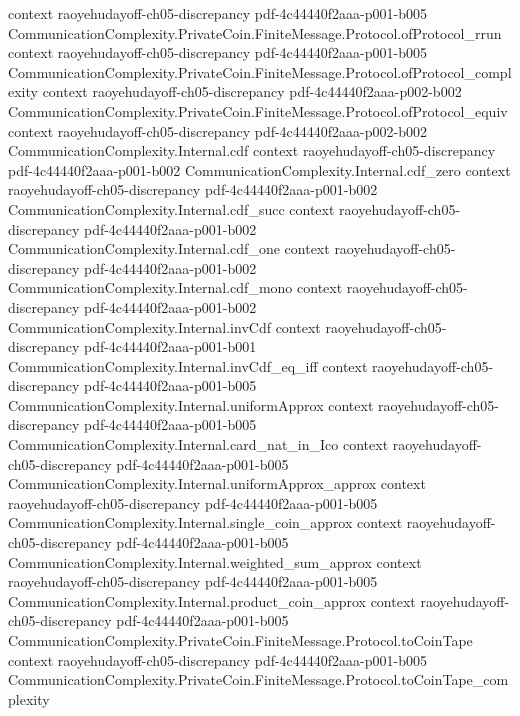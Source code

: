 \begin{lemma}
  {context}
  {raoyehudayoff-ch05-discrepancy}
  {pdf-4c44440f2aaa-p001-b005}
\proofstep
  {CommunicationComplexity.PrivateCoin.FiniteMessage.Protocol.ofProtocol_rrun}
  {context}
  {raoyehudayoff-ch05-discrepancy}
  {pdf-4c44440f2aaa-p001-b005}
\proofstep
  {CommunicationComplexity.PrivateCoin.FiniteMessage.Protocol.ofProtocol_complexity}
  {context}
  {raoyehudayoff-ch05-discrepancy}
  {pdf-4c44440f2aaa-p002-b002}
\proofstep
  {CommunicationComplexity.PrivateCoin.FiniteMessage.Protocol.ofProtocol_equiv}
  {context}
  {raoyehudayoff-ch05-discrepancy}
  {pdf-4c44440f2aaa-p002-b002}
\proofstep
  {CommunicationComplexity.Internal.cdf}
  {context}
  {raoyehudayoff-ch05-discrepancy}
  {pdf-4c44440f2aaa-p001-b002}
\proofstep
  {CommunicationComplexity.Internal.cdf_zero}
  {context}
  {raoyehudayoff-ch05-discrepancy}
  {pdf-4c44440f2aaa-p001-b002}
\proofstep
  {CommunicationComplexity.Internal.cdf_succ}
  {context}
  {raoyehudayoff-ch05-discrepancy}
  {pdf-4c44440f2aaa-p001-b002}
\proofstep
  {CommunicationComplexity.Internal.cdf_one}
  {context}
  {raoyehudayoff-ch05-discrepancy}
  {pdf-4c44440f2aaa-p001-b002}
\proofstep
  {CommunicationComplexity.Internal.cdf_mono}
  {context}
  {raoyehudayoff-ch05-discrepancy}
  {pdf-4c44440f2aaa-p001-b002}
\proofstep
  {CommunicationComplexity.Internal.invCdf}
  {context}
  {raoyehudayoff-ch05-discrepancy}
  {pdf-4c44440f2aaa-p001-b001}
\proofstep
  {CommunicationComplexity.Internal.invCdf_eq_iff}
  {context}
  {raoyehudayoff-ch05-discrepancy}
  {pdf-4c44440f2aaa-p001-b005}
\proofstep
  {CommunicationComplexity.Internal.uniformApprox}
  {context}
  {raoyehudayoff-ch05-discrepancy}
  {pdf-4c44440f2aaa-p001-b005}
\proofstep
  {CommunicationComplexity.Internal.card_nat_in_Ico}
  {context}
  {raoyehudayoff-ch05-discrepancy}
  {pdf-4c44440f2aaa-p001-b005}
\proofstep
  {CommunicationComplexity.Internal.uniformApprox_approx}
  {context}
  {raoyehudayoff-ch05-discrepancy}
  {pdf-4c44440f2aaa-p001-b005}
\proofstep
  {CommunicationComplexity.Internal.single_coin_approx}
  {context}
  {raoyehudayoff-ch05-discrepancy}
  {pdf-4c44440f2aaa-p001-b005}
\proofstep
  {CommunicationComplexity.Internal.weighted_sum_approx}
  {context}
  {raoyehudayoff-ch05-discrepancy}
  {pdf-4c44440f2aaa-p001-b005}
\proofstep
  {CommunicationComplexity.Internal.product_coin_approx}
  {context}
  {raoyehudayoff-ch05-discrepancy}
  {pdf-4c44440f2aaa-p001-b005}
\proofstep
  {CommunicationComplexity.PrivateCoin.FiniteMessage.Protocol.toCoinTape}
  {context}
  {raoyehudayoff-ch05-discrepancy}
  {pdf-4c44440f2aaa-p001-b005}
\proofstep
  {CommunicationComplexity.PrivateCoin.FiniteMessage.Protocol.toCoinTape_complexity}

\end{lemma}
